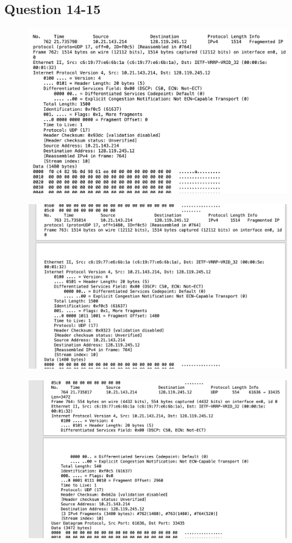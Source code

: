 \documentclass{article}
\begin{document}
\begin{CJK*}{UTF8}{gbsn}
\subsection{Question 14-15}
\begin{figure}[H]
    \centering
    \includegraphics[width=1.0\textwidth]{14-1.png}
\end{figure}
\begin{figure}[H]
    \centering
    \includegraphics[width=1.0\textwidth]{14-2.png}
\end{figure}
\begin{figure}[H]
    \centering
    \includegraphics[width=1.0\textwidth]{14-3.png}

\end{figure}
\end{CJK*}
\end{document}
